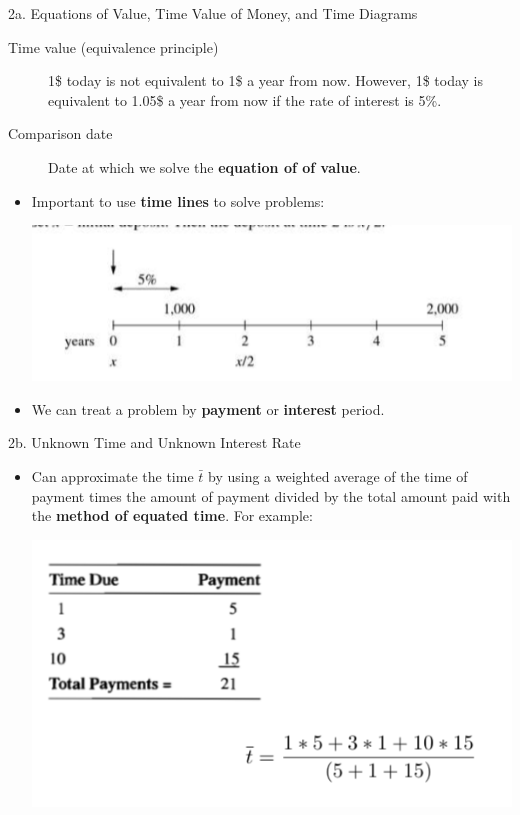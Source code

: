 \begin{CHPT_SUMM_AUTO}[label = {L.-2a}]{{2a. Equations of Value, Time Value of Money, and Time Diagrams}}
\begin{description}
	\item[Time value (equivalence principle)]	1\$ today is not equivalent to 1\$ a year from now. However, 1\$ today is equivalent to 1.05\$ a year from now if the rate of interest is 5\%. 
	\item[Comparison date]	Date at which we solve the \textbf{equation of of value}.
\end{description}
	\begin{itemize}[leftmargin = *]
		\item	Important to use \textbf{time lines} to solve problems:
		\begin{center}
		\includegraphics[scale=0.4]{img/time-value-timeline.png}
		\end{center}
		\item	We can treat a problem by \textbf{payment} or \textbf{interest} period.
	\end{itemize}
\end{CHPT_SUMM_AUTO}

\begin{CHPT_SUMM_AUTO}[label = {L.-2b}]{2b. Unknown Time and Unknown Interest Rate}
	\begin{itemize}[leftmargin = *]
		\item	Can approximate the time $\bar{t}$ by using a weighted average of the time of payment times the amount of payment divided by the total amount paid with the \textbf{method of equated time}. For example:
		\begin{center}
		\includegraphics[scale=0.5]{img/approx-time-pmt.png}
		\end{center}
	\end{itemize}
\end{CHPT_SUMM_AUTO}
